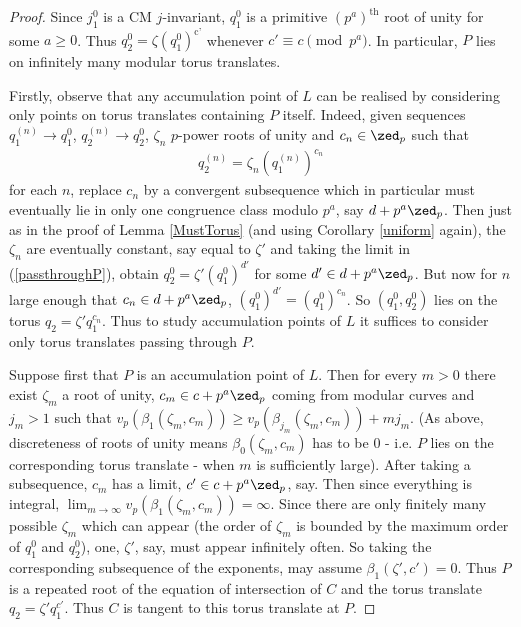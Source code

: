\documentclass[12pt,letterpaper]{article}
\begin{document}
	
	\begin{proof}
		
		Since $j_1^0$ is a CM $j$-invariant, $q_1^0$ is a primitive $(p^a)^\text{th}$ root of unity for some $a\geq0$. Thus $q_2^0 = \zeta (q_1^0)^\text{c'}$ whenever $c'\equiv c\pmod{p^a}$. In particular, $P$ lies on infinitely many modular torus translates. 
		
		Firstly, observe that any accumulation point of $L$ can be realised by considering only points on torus translates containing $P$ itself. Indeed, given sequences $q_1^{(n)}\to q_1^0$, $q_2^{(n)}\to q_2^0$, $\zeta_n$ $p$-power roots of unity and $c_n\in \zed_p$ such that 
		\begin{align}\label{passthroughP}
			 q_2^{(n)}=\zeta_n(q_1^{(n)})^{c_n}
		\end{align}
		 for each $n$, replace $c_n$ by a convergent subsequence which in particular must eventually lie in only one congruence class modulo $p^a$, say $d+p^a\zed_p$. Then just as in the proof of Lemma \ref{MustTorus} (and using Corollary \ref{uniform} again), the $\zeta_n$ are eventually constant, say equal to $\zeta'$ and taking the limit in (\ref{passthroughP}), obtain $q_2^0 = \zeta'(q_1^0)^{d'}$ for some $d'\in d+p^a\zed_p$.  But now for $n$ large enough that $c_n\in d+p^a\zed_p$, $(q_1^0)^{d'}=(q_1^0)^{c_n}$. So $(q_1^0,q_2^0)$ lies on the torus $q_2 = \zeta'q_1^{c_n}$. Thus to study accumulation points of $L$ it suffices to consider only torus translates passing through $P$. 

		
		
		
		Suppose first that $P$ is an accumulation point of $L$. Then for every $m>0$ there exist $\zeta_m$ a root of unity, $c_m\in c+p^a\zed_p$ coming from modular curves and $j_m>1$ such that $v_p(\beta_1(\zeta_m,c_m)) \geq v_p(\beta_{j_m}(\zeta_m, c_m))+mj_m$. (As above, discreteness of roots of unity means $\beta_0(\zeta_m,c_m)$ has to be 0 - i.e. $P$ lies on the corresponding torus translate - when $m$ is sufficiently large). After taking a subsequence, $c_m$ has a limit, $c'\in c+p^a\zed_p$, say. Then since everything is integral, $\lim_{m\to\infty}v_p(\beta_1(\zeta_m,c_m))=\infty$. Since there are only finitely many possible $\zeta_m$ which can appear (the order of $\zeta_m$ is bounded by the maximum order of $q_1^0$ and $q_2^0$), one, $\zeta'$, say, must appear infinitely often. So taking the corresponding subsequence of the exponents, may assume $\beta_1(\zeta',c')=0$. Thus $P$ is a repeated root of the equation of intersection of $C$ and the torus translate $q_2 = \zeta' q_1^{c'}$. Thus $C$ is tangent to this torus translate at $P$.
	

\end{proof}
\end{document}
